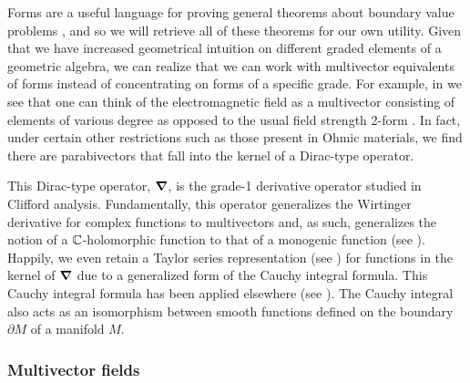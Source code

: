 Forms are a useful language for proving general theorems about boundary value problems \cite{schwarz_hodge_1995}, and so we will retrieve all of these theorems for our own utility. Given that we have increased geometrical intuition on different graded elements of a geometric algebra, we can realize that we can work with multivector equivalents of forms instead of concentrating on forms of a specific grade. For example, in  we see that one can think of the electromagnetic field as a multivector consisting of elements of various degree as opposed to the usual field strength 2-form . In fact, under certain other restrictions such as those present in Ohmic materials, we find there are parabivectors that fall into the kernel of a Dirac-type operator.

This Dirac-type operator, $\boldsymbol{\nabla}$, is the grade-1 derivative operator studied in Clifford analysis. Fundamentally, this operator generalizes the Wirtinger derivative for complex functions to multivectors and, as such, generalizes the notion of a $\mathbb{C}$-holomorphic function to that of a monogenic function (see ). Happily, we even retain a Taylor series representation (see ) for functions in the kernel of $\boldsymbol{\nabla}$ due to a generalized form of the Cauchy integral formula. This Cauchy integral formula has been applied elsewhere (see \cite{brackx_hilbert_2008}). The Cauchy integral also acts as an isomorphism between smooth functions defined on the boundary $\partial M$ of a manifold $M$. 

\subsubsection{Multivector fields}

